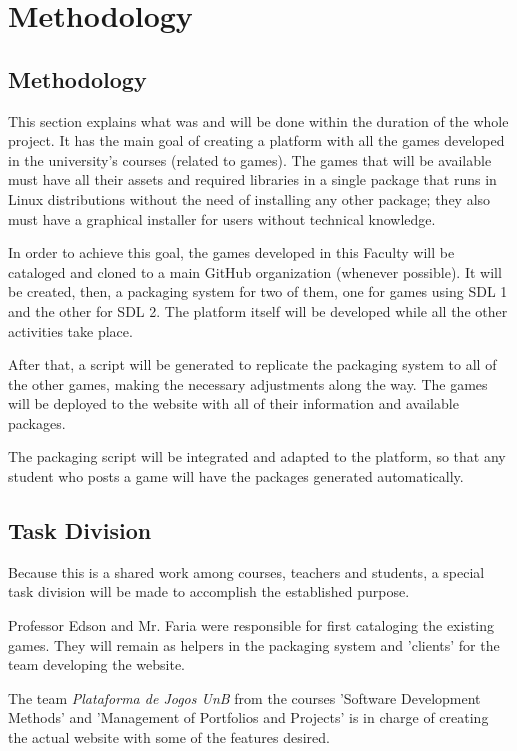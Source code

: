 \chapter[Methodology]{Methodology}
\section[Methodology]{Methodology}

This section explains what was and will be done within the duration of the
whole project. It has the main goal of creating a platform with all the games
developed in the university's courses (related to games). The games that will
be available must have all their assets and required libraries in a single
package that runs in Linux distributions without the need of installing any other package;
they also must have a graphical installer for users without technical
knowledge.

In order to achieve this goal, the games developed in this Faculty will be cataloged and cloned to a main GitHub organization (whenever possible).
It will be created, then, a packaging system for two of them, one for games
using SDL 1 and the other for SDL 2. The platform itself will be developed while all the other activities take place.

After that, a script will be generated to replicate the packaging system to all
of the other games, making the necessary adjustments along the way. The games
will be deployed to the website with all of their information and available
packages.

The packaging script will be integrated and adapted to the platform, so that any student who posts a game will have the packages generated automatically.

\section[Task Division]{Task Division}

Because this is a shared work among courses, teachers and students, a special
task division will be made to accomplish the established purpose.

Professor Edson and Mr. Faria were responsible for first cataloging the existing games. They will remain as helpers in the packaging system and 'clients'
for the team developing the website.

The team \textit{Plataforma de Jogos UnB} from the courses 'Software
Development Methods' and 'Management of Portfolios and Projects' is
in charge of creating the actual website with some of the features desired.

